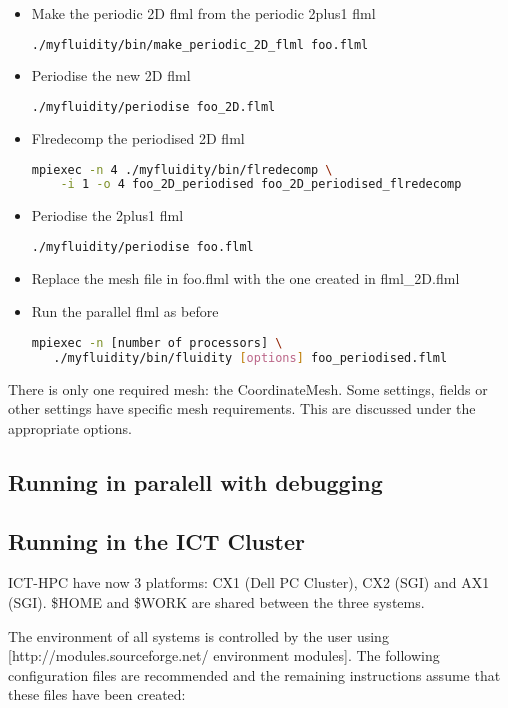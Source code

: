 \begin{itemize}
\item Make the periodic 2D flml from the periodic 2plus1 flml
\begin{lstlisting}[language=bash]
 ./myfluidity/bin/make_periodic_2D_flml foo.flml
\end{lstlisting}
\item Periodise the new 2D flml
\begin{lstlisting}[language=bash]
 ./myfluidity/periodise foo_2D.flml
\end{lstlisting}
\item Flredecomp the periodised 2D flml
\begin{lstlisting}[language=bash]
mpiexec -n 4 ./myfluidity/bin/flredecomp \
    -i 1 -o 4 foo_2D_periodised foo_2D_periodised_flredecomp
\end{lstlisting}
\item Periodise the 2plus1 flml
\begin{lstlisting}[language=bash]
 ./myfluidity/periodise foo.flml
\end{lstlisting}
\item Replace the mesh file in foo.flml with the one created in flml\_2D.flml
\item Run the parallel flml as before
\begin{lstlisting}[language=bash]
mpiexec -n [number of processors] \
   ./myfluidity/bin/fluidity [options] foo_periodised.flml
\end{lstlisting}
\end{itemize}

There is only one required mesh: the CoordinateMesh. Some settings, fields or other
settings have specific mesh requirements. This are discussed under the appropriate options.

\subsection{Running in paralell with debugging}

\subsection{Running in the ICT Cluster}

ICT-HPC have now 3 platforms: CX1 (Dell PC Cluster), CX2 (SGI) and AX1 (SGI). \$HOME and \$WORK are shared between the three systems.

The environment of all systems is controlled by the user using [http://modules.sourceforge.net/ environment modules]. The following configuration files are recommended and the remaining instructions assume that these files have been created:

